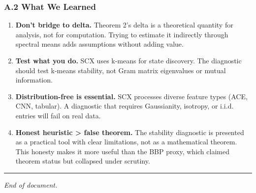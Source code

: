 \documentclass[
  12pt,
]{article}
\begin{document}
\subsubsection{A.2 What We Learned}\label{a.2-what-we-learned}

\begin{enumerate}
\def\labelenumi{\arabic{enumi}.}
\item
  \textbf{Don't bridge to delta.} Theorem 2's delta is a theoretical
  quantity for analysis, not for computation. Trying to estimate it
  indirectly through spectral means adds assumptions without adding
  value.
\item
  \textbf{Test what you do.} SCX uses k-means for state discovery. The
  diagnostic should test k-means stability, not Gram matrix eigenvalues
  or mutual information.
\item
  \textbf{Distribution-free is essential.} SCX processes diverse feature
  types (ACE, CNN, tabular). A diagnostic that requires Gaussianity,
  isotropy, or i.i.d. entries will fail on real data.
\item
  \textbf{Honest heuristic \textgreater{} false theorem.} The stability
  diagnostic is presented as a practical tool with clear limitations,
  not as a mathematical theorem. This honesty makes it more useful than
  the BBP proxy, which claimed theorem status but collapsed under
  scrutiny.
\end{enumerate}

\begin{center}\rule{0.5\linewidth}{0.5pt}\end{center}

\emph{End of document.}
\end{document}
